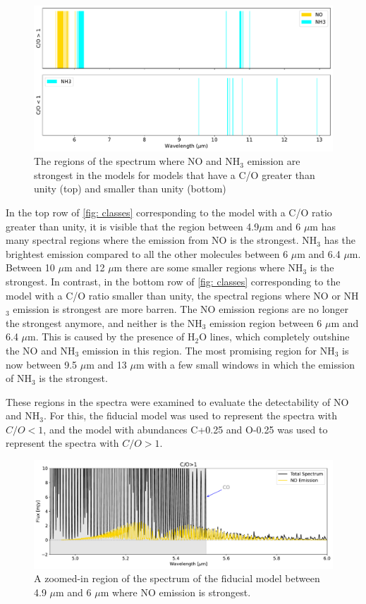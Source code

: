 \documentclass[twoside, single, authoryear, semicolon, 12pt]{lion-msc}
\newcommand{\4}{$_4$}
\newcommand{\3}{$_3$}
\newcommand{\2}{$_2$}
\begin{document}
\begin{figure}[H]
    \centering
    \includegraphics[width=\linewidth]{Figures/ClassificationCO.pdf}
    \caption{The regions of the spectrum where NO and NH\3 emission are strongest in the models for models that have a C/O greater than unity (top) and smaller than unity (bottom)}
    \label{fig: classes}
\end{figure}

In the top row of \autoref{fig: classes} corresponding to the model with a C/O ratio greater than unity, it is visible that the region between 4.9$\mu$m and 6 $\mu$m has many spectral regions where the emission from NO is the strongest. NH\3 has the brightest emission compared to all the other molecules between 6 $\mu$m and 6.4 $\mu$m. Between 10 $\mu$m and 12 $\mu$m there are some smaller regions where NH\3 is the strongest. In contrast, in the bottom row of \autoref{fig: classes} corresponding to the model with a C/O ratio smaller than unity, the spectral regions where NO or NH\3 emission is strongest are more barren. The NO emission regions are no longer the strongest anymore, and neither is the NH\3 emission region between 6 $\mu$m and 6.4 $\mu$m. This is caused by the presence of H\2O lines, which completely outshine the NO and NH\3 emission in this region. The most promising region for NH\3 is now between 9.5 $\mu$m and 13 $\mu$m with a few small windows in which the emission of NH\3 is the strongest.

These regions in the spectra were examined to evaluate the detectability of NO and NH\3. For this, the fiducial model was used to represent the spectra with $C/O<1$, and the model with abundances C+0.25 and O-0.25 was used to represent the spectra with $C/O>1$.

\begin{figure}[H]
    \centering
    \includegraphics[width=\linewidth]{Figures/NO_region.pdf}
    \caption{A zoomed-in region of the spectrum of the fiducial model between 4.9 $\mu$m and 6 $\mu$m where NO emission is strongest.}
    \label{fig: NO region}
\end{figure}
\end{document}
